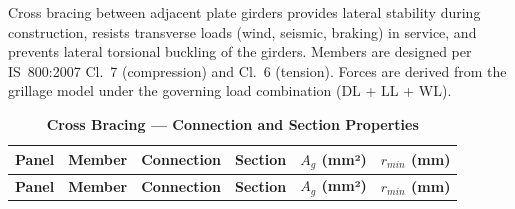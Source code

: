 \documentclass[12pt,a4paper]{report}
\numberwithin{table}{chapter}
\numberwithin{figure}{chapter}
\newcommand{\ReportTablePaddingCompact}{4pt}
\newcommand{\ReportTableRowGap}{6pt}
\begin{document}
Cross bracing between adjacent plate girders provides lateral stability during construction, resists transverse loads (wind, seismic, braking) in service, and prevents lateral torsional buckling of the girders. Members are designed per IS~800:2007 Cl.~7 (compression) and Cl.~6 (tension). Forces are derived from the grillage model under the governing load combination  (DL + LL + WL).

\vspace{1em}

\vspace{0.4em}
\noindent
\setlength{\tabcolsep}{\ReportTablePaddingCompact}
\setlength\LTleft{0pt}
\setlength\LTright{\fill}

\begin{longtable}{|C{2.0cm}|L{2.0cm}|L{2.2cm}|C{2.5cm}|C{2.0cm}|C{2.0cm}|}
\caption{\textbf{Cross Bracing --- Connection and Section Properties}}\\
\hline
\textbf{Panel} & \textbf{Member} & \textbf{Connection} & \textbf{Section} & \textbf{$A_g$ (mm²)} & \textbf{$r_{min}$ (mm)} \\[\ReportTableRowGap]
\hline
\endfirsthead
\hline
\textbf{Panel} & \textbf{Member} & \textbf{Connection} & \textbf{Section} & \textbf{$A_g$ (mm²)} & \textbf{$r_{min}$ (mm)} \\[\ReportTableRowGap]
\hline
\endhead


\end{longtable}
\end{document}
